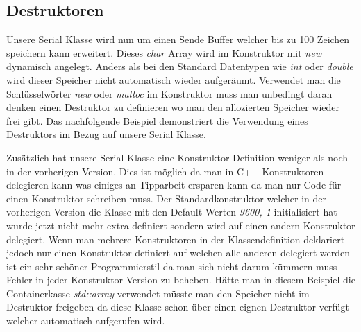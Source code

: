 \documentclass[MES,Master,ngerman]{twbook}%
\begin{document}
\subsection{Destruktoren}
Unsere Serial Klasse wird nun um einen Sende Buffer welcher bis zu 100 Zeichen speichern kann erweitert. Dieses \textit{char} Array wird im Konstruktor mit \textit{new} dynamisch angelegt. Anders als bei den Standard Datentypen wie \textit{int} oder \textit{double} wird dieser Speicher nicht automatisch wieder aufgeräumt. Verwendet man die Schlüsselwörter \textit{new} oder \textit{malloc} im Konstruktor muss man unbedingt daran denken einen Destruktor zu definieren wo man den allozierten Speicher wieder frei gibt. Das nachfolgende Beispiel demonstriert die Verwendung eines Destruktors im Bezug auf unsere Serial Klasse.  

\begin{figure}[!htb]
	\begin{subfigure}[b]{0.5\textwidth}
		
		\label{fig:28}
	\end{subfigure}
	\begin{subfigure}[b]{0.5\textwidth}
		
		\label{fig:29}
	\end{subfigure}
\end{figure}

Zusätzlich hat unsere Serial Klasse eine Konstruktor Definition weniger als noch in der vorherigen Version. Dies ist möglich da man in C++ Konstruktoren delegieren kann was einiges an Tipparbeit ersparen kann da man nur Code für einen Konstruktor schreiben muss. Der Standardkonstruktor welcher in der vorherigen Version die Klasse mit den Default Werten \textit{9600, 1} initialisiert hat wurde jetzt nicht mehr extra definiert sondern wird auf einen andern Konstruktor delegiert. Wenn man mehrere Konstruktoren in der Klassendefinition deklariert jedoch nur einen Konstruktor definiert auf welchen alle anderen delegiert werden ist ein sehr schöner Programmierstil da man sich nicht darum kümmern muss Fehler in jeder Konstruktor Version zu beheben. Hätte man in diesem Beispiel die Containerkasse \textit{std::array} verwendet müsste man den Speicher nicht im Destruktor freigeben da diese Klasse schon über einen eignen Destruktor verfügt welcher automatisch aufgerufen wird.
\end{document}
